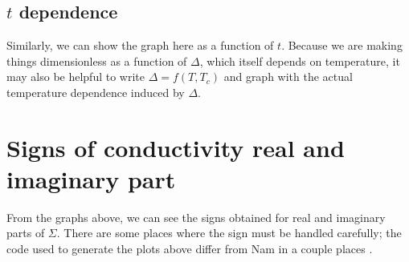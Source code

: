 \documentclass[11pt]{article}
\begin{document}
\subsection{$t$ dependence} \label{subsec:NamForm.Graph.TDep}
Similarly, we can show the graph here as a function of $t$. 
Because we are making things dimensionless as a function of $\Delta$, which itself depends on temperature, it may also be helpful to write $\Delta = f(T, T_c)$ and graph with the actual temperature dependence induced by $\Delta$. 

\section{Signs of conductivity real and imaginary part} \label{sec:NamForm.Signs}
From the graphs above, we can see the signs obtained for real and imaginary parts of $\Sigma$. 
There are some places where the sign must be handled carefully; the code used to generate the plots above differ from Nam in a couple places .
\end{document}

